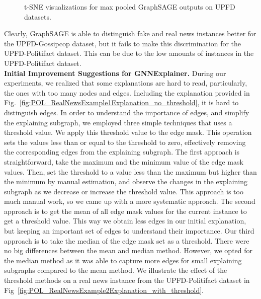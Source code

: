 \begin{figure}
    \centering
    \hfill
    \caption[t-SNE visualizations for GraphSAGE.]{t-SNE visualizations for max pooled GraphSAGE outputs on UPFD datasets.}
    \label{fig:TSNE_GraphSAGE}
\end{figure}
Clearly, GraphSAGE is able to distinguish fake and real news instances better for the UPFD-Gossipcop dataset, but it fails to make this discrimination for the UPFD-Politifact dataset. This can be due to the low amounts of instances in the UPFD-Politifact dataset.\\
\textbf{Initial Improvement Suggestions for GNNExplainer.} During our experiments, we realized that some explanations are hard to read, particularly, the ones with too many nodes and edges. Including the explanation provided in Fig.~\ref{fig:POL_RealNewsExample1Explanation_no_threshold}, it is hard to distinguish edges. In order to understand the importance of edges, and simplify the explaining subgraph, we employed three simple techniques that uses a threshold value. We apply this threshold value to the edge mask. This operation  sets the values less than or equal to the threshold to zero, effectively removing the corresponding edges from the explaining subgraph. The first approach is straightforward, take the maximum and the minimum value of the edge mask values. Then, set the threshold to a value less than the maximum but higher than the minimum by manual estimation, and observe the changes in the explaining subgraph as we decrease or increase the threshold value. This approach is too much manual work, so we came up with a more systematic approach. The second approach is to get the mean of all edge mask values for the current instance to get a threshold value. This way we obtain less edges in our initial explanation, but keeping an important set of edges to understand their importance. Our third approach is to take the median of the edge mask set as a threshold. There were no big differences between the mean and median method. However, we opted for the median method as it was able to capture more edges for small explaining subgraphs compared to the mean method. We illustrate the effect of the threshold methods on a real news instance from the UPFD-Politifact dataset in Fig~\ref{fig:POL_RealNewsExample2Explanation_with_threshold}.\\
